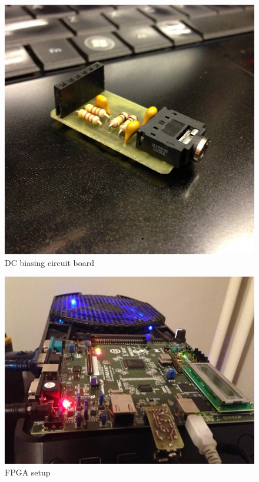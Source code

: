 \documentclass[letterpaper]{article}
\begin{document}
    \begin{figure}
        \centering
        \includegraphics[scale=0.25]{fig/dcbiasbrd.jpg}
        \caption{DC biasing circuit board}
        \label{fig:dcbiasbrd}
    \end{figure}

    \begin{figure}
        \centering
        \includegraphics[scale=0.5]{fig/setup.jpg}
        \caption{FPGA setup}
        \label{fig:setup}
    \end{figure}
\end{document}
